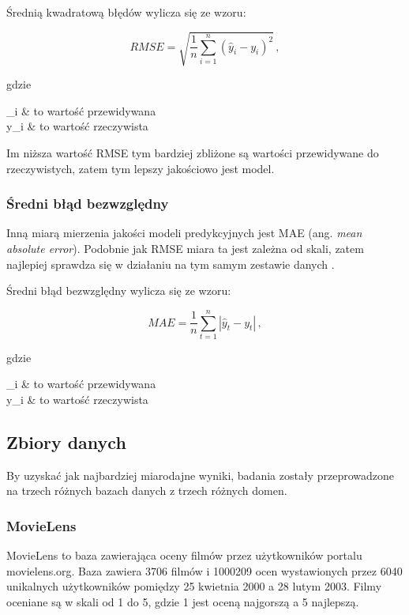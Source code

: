 \documentclass[twoside]{iisthesis}
\begin{document}
		Średnią kwadratową błędów wylicza się ze wzoru:
		
		\begin{equation}
			\label{eq:rmse}
			RMSE = \sqrt{ \frac{1}{n} \sum_{i=1}^{n} (\hat{y}_i - y_i)^2 }
			\,,
		\end{equation}
	
		gdzie
		
		\begin{conditions*}
			_i & to wartość przewidywana \\
			y_i  &  to wartość rzeczywista
		\end{conditions*} 
		
		Im niższa wartość RMSE tym bardziej zbliżone są wartości przewidywane do rzeczywistych, zatem tym lepszy jakościowo jest model. 
		
		\subsubsection{Średni błąd bezwzględny}
		
		Inną miarą mierzenia jakości modeli predykcyjnych jest MAE (ang. \textit{mean absolute error}). Podobnie jak RMSE miara ta jest zależna od skali, zatem najlepiej sprawdza się w działaniu na tym samym zestawie danych \cite{hyndman2006another}. 
		
		Średni błąd bezwzględny wylicza się ze wzoru:
		
		\begin{equation}
		\label{eq:mae}
		MAE = \frac{1}{n} \sum_{t=1}^{n} |\hat{y}_t - y_t|
		\,,
		\end{equation}
		
		gdzie
		
		\begin{conditions*}
			_i & to wartość przewidywana \\
			y_i  &  to wartość rzeczywista
		\end{conditions*} 
	
	
		\subsection{Zbiory danych}
		
		By uzyskać jak najbardziej miarodajne wyniki, badania zostały przeprowadzone na trzech różnych bazach danych z trzech różnych domen. 
		
		\subsubsection{MovieLens}
		MovieLens \cite{harper2016movielens} to baza zawierająca oceny filmów przez użytkowników portalu movielens.org. Baza zawiera 3706 filmów i 1000209 ocen wystawionych przez 6040 unikalnych użytkowników pomiędzy 25 kwietnia 2000 a 28 lutym 2003. Filmy oceniane są w skali od 1 do 5, gdzie 1 jest oceną najgorszą a 5 najlepszą. 
		
\end{document}

